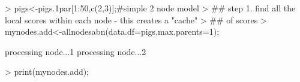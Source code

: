 \documentclass[nojss]{jss}
\begin{document}
\begin{Schunk}
\begin{Sinput}
> pigs<-pigs.1par[1:50,c(2,3)];#simple 2 node model
> ## step 1. find all the local scores within each node - this creates a "cache"
> ##                                                                   of scores
> mynodes.add<-allnodesabn(data.df=pigs,max.parents=1); 
\end{Sinput}
\begin{Soutput}
processing node...1
processing node...2
\end{Soutput}
\begin{Sinput}
> print(mynodes.add);
\end{Sinput}
\end{Schunk}
\end{document}
